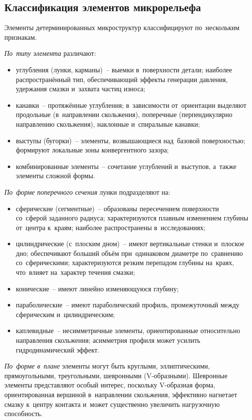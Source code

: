 \subsection{Классификация элементов микрорельефа}

Элементы детерминированных микроструктур классифицируют по~нескольким признакам.

\textit{По~типу элемента} различают:
\begin{itemize}
\item углубления (лунки, карманы)~-- выемки в~поверхности детали; наиболее распространённый тип, обеспечивающий эффекты генерации давления, удержания смазки и~захвата частиц износа;
\item канавки~-- протяжённые углубления; в~зависимости от~ориентации выделяют продольные (в~направлении скольжения), поперечные (перпендикулярно направлению скольжения), наклонные и~спиральные канавки;
\item выступы (бугорки)~-- элементы, возвышающиеся над~базовой поверхностью; формируют локальные зоны конвергентного зазора;
\item комбинированные элементы~-- сочетание углублений и~выступов, а~также элементы сложной формы.
\end{itemize}

\textit{По~форме поперечного сечения} лунки подразделяют на:
\begin{itemize}
\item сферические (сегментные)~-- образованы пересечением поверхности со~сферой заданного радиуса; характеризуются плавным изменением глубины от~центра к~краям; наиболее распространены в~исследованиях;
\item цилиндрические (с~плоским дном)~-- имеют вертикальные стенки и~плоское дно; обеспечивают больший объём при~одинаковом диаметре по~сравнению со~сферическими; характеризуются резким перепадом глубины на~краях, что~влияет на~характер течения смазки;
\item конические~-- имеют линейно изменяющуюся глубину;
\item параболические~-- имеют параболический профиль, промежуточный между сферическим и~цилиндрическим;
\item каплевидные~-- несимметричные элементы, ориентированные относительно направления скольжения; асимметрия профиля может усилить гидродинамический эффект.
\end{itemize}

\textit{По~форме в~плане} элементы могут быть круглыми, эллиптическими, прямоугольными, треугольными, шевронными (V-образными). Шевронные элементы представляют особый интерес, поскольку V-образная форма, ориентированная вершиной в~направлении скольжения, эффективно нагнетает смазку к~центру контакта и~может существенно увеличить нагрузочную способность.

